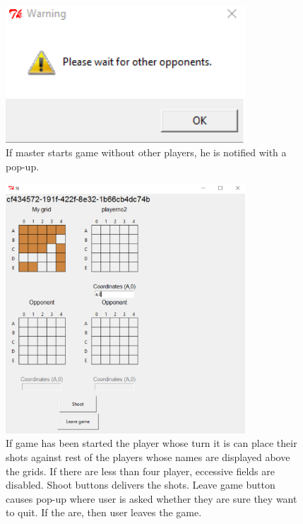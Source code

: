 \documentclass[]{article}
\begin{document}
\begin{figure}[!hbt]
	\centering
	\includegraphics[width=0.8\textwidth]{WaitPlayers.png}
	\caption{If master starts game without other players, he is notified with a pop-up.}
	\label{fig:Waitplayers}
\end{figure}

\begin{figure}[!hbt]
	\centering
	\includegraphics[width=0.8\textwidth]{GameOn.png}
	\caption{If game has been started the player whose turn it is can place their shots against rest of the players whose names are displayed above the grids. If there are less than four player, eccessive fields are disabled. Shoot buttons delivers the shots. Leave game button causes pop-up where user is asked whether they are sure they want to quit. If the are, then user leaves the game.}
	\label{fig:Gameon}
\end{figure}
\end{document}
